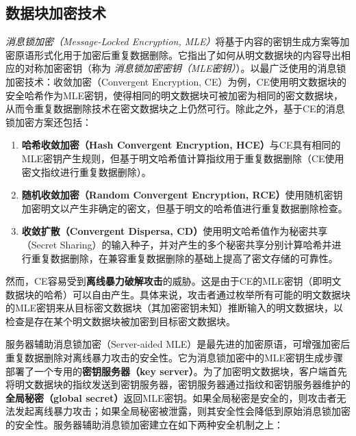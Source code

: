 \subsection{数据块加密技术}
\label{subsec:background-encrypted-deduplication-key}

\textit{消息锁加密（Message-Locked Encryption, MLE）}\cite{bellare2013MLE}将基于内容的密钥生成方案等加密原语形式化用于加密后重复数据删除。它指出了如何从明文数据块的内容导出相应的对称加密密钥（称为 \textit{消息锁加密密钥（MLE密钥）}）。以最广泛使用的消息锁加密技术：收敛加密（Convergent Encryption, CE）\cite{douceur2002reclaiming}为例，CE使用明文数据块的安全哈希作为MLE密钥，使得相同的明文数据块可被加密为相同的密文数据块，从而令重复数据删除技术在密文数据块之上仍然可行。除此之外，基于CE的消息锁加密方案还包括：

\begin{enumerate}[leftmargin=*]
    \item \textbf{哈希收敛加密（Hash Convergent Encryption, HCE）}\cite{douceur2002reclaiming}与CE具有相同的MLE密钥产生规则，但基于明文哈希值计算指纹用于重复数据删除（CE使用密文指纹进行重复数据删除）。
    \item \textbf{随机收敛加密（Random Convergent Encryption, RCE）}\cite{douceur2002reclaiming}使用随机密钥加密明文以产生非确定的密文，但基于明文的哈希值进行重复数据删除检查。
    \item \textbf{收敛扩散（Convergent Dispersa, CD）}\cite{li2016cdstore}使用明文哈希值作为秘密共享（Secret Sharing）的输入种子，并对产生的多个秘密共享分别计算哈希并进行重复数据删除，在兼容重复数据删除的基础上提高了密文存储的可靠性。
\end{enumerate}

然而，CE容易受到\textbf{离线暴力破解攻击}的威胁。这是由于CE的MLE密钥（即明文数据块的哈希）可以自由产生。具体来说，攻击者通过枚举所有可能的明文数据块的MLE密钥来从目标密文数据块（其加密密钥未知）推断输入的明文数据块，以检查是存在某个明文数据块被加密到目标密文数据块。

服务器辅助消息锁加密（Server-aided MLE）\cite{bellare2013DupLESS}是最先进的加密原语，可增强加密后重复数据删除对离线暴力攻击的安全性。它为消息锁加密中的MLE密钥生成步骤部署了一个专用的\textbf{密钥服务器（key server）}。为了加密明文数据块，客户端首先将明文数据块的指纹发送到密钥服务器，密钥服务器通过指纹和密钥服务器维护的\textbf{全局秘密（global secret）}返回MLE密钥。如果全局秘密是安全的，则攻击者无法发起离线暴力攻击；如果全局秘密被泄露，则其安全性会降低到原始消息锁加密的安全性。服务器辅助消息锁加密建立在如下两种安全机制之上：

